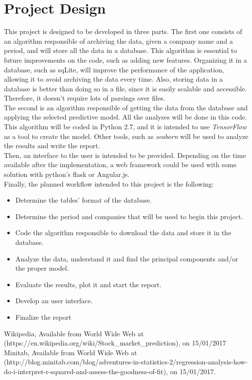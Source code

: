 \documentclass[a4paper, 11pt]{article}
\begin{document}
\section*{Project Design}
This project is designed to be developed in three parts. The first one consists of an algorithm responsible of archiving the data, given a company name and a period, and will store all the data in a database. This algorithm is essential to future improvements on the code, such as 
 adding new features. Organizing it in a database, such as sqLite, will improve the performance of the application, allowing it to avoid archiving the data every time. Also, storing data in a database is better
 than doing so in a file, since it is easily scalable and accessible. Therefore, it doesn't require lots of parsings over files.
 \newline
 \\
 The second is an algorithm responsible of getting the data from the database and applying the selected predictive model. All the analyses will be done in this code. This algorithm will be coded in Python 2.7,
 and it is intended to use \emph{TensorFlow} as a tool to create the model. Other tools, such as \emph{seaborn} will be used to analyze the results and write the report. 
 \newline
 \\
 Then, an  interface to the user is intended to be provided. Depending on the time available after the implementation, a web framework could be used with  some solution with python's flask or Angular.js. 
 \newline
 \\
Finally, the planned workflow intended to this project is the following:
\begin{itemize}
 \item Determine the tables' format  of the database.
 \item Determine the period and companies that will be used to begin this project.
 \item Code the algorithm responsible to download the data and store it in the database.
 \item Analyze the data, understand it and find the principal components and/or the proper model.
 \item Evaluate the results, plot it and start the report.
 \item Develop an user interface.
 \item Finalize the report
\end{itemize}

\begin{thebibliography}{9}
 Wikipedia, Available from World Wide Web at (https://en.wikipedia.org/wiki/Stock\_market\_prediction), on 15/01/2017 
 Minitab, Available from World Wide Web at (http://blog.minitab.com/blog/adventures-in-statistics-2/regression-analysis-how-do-i-interpret-r-squared-and-assess-the-goodness-of-fit), on 15/01/2017.
\end{thebibliography}
\end{document}
